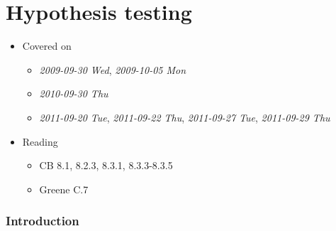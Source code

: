 
\part*{Hypothesis testing}%

\begin{itemize}
\item Covered on
\begin{itemize}
\item \textit{2009-09-30 Wed}, \textit{2009-10-05 Mon}
\item \textit{2010-09-30 Thu}
\item \textit{2011-09-20 Tue}, \textit{2011-09-22 Thu}, \textit{2011-09-27 Tue},
       \textit{2011-09-29 Thu}
\end{itemize}
\item Reading
\begin{itemize}
\item CB 8.1, 8.2.3, 8.3.1, 8.3.3-8.3.5
\item Greene C.7
\end{itemize}
\end{itemize}
\section{Introduction}
\label{sec-1}

